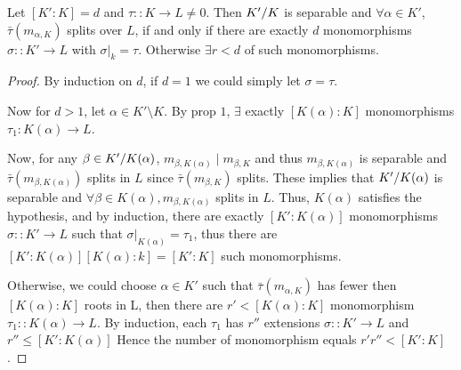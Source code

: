 \begin{prop}\label{prop:separable-field-split-have-most-embeddings}
  Let $[K': K] = d$ and $\tau:: K \to L \neq 0$. Then ${K'}/{K}$ is separable and $\forall \alpha \in K'$,
  $\bar\tau(m_{\alpha, K})$ splits over $L$, if and only if there are exactly
  $d$ monomorphisms $\sigma::K' \to L$ with $\sigma\big|_k = \tau$.
  Otherwise $\exists r < d$ of such monomorphisms.

  \begin{proof}
    By induction on $d$, if $d = 1$ we could simply let $\sigma = \tau$.

    Now for $d > 1$, let $\alpha \in K' \setminus K$.
    By prop $1$, $\exists$ exactly $[K(\alpha): K]$ monomorphisms $\tau_1: K(\alpha) \to L$.

    Now, for any $\beta \in {K'}/{K(\alpha)}$,
    $m_{\beta, K(\alpha)} \mid m_{\beta, K}$ and thus $m_{\beta, K(\alpha)}$ is separable
    and $\bar\tau(m_{\beta, K(\alpha)})$ splits in $L$ since $\bar\tau(m_{\beta, K})$ splits.
    These implies that ${K'}/{K(\alpha)}$ is separable and $\forall \beta \in K(\alpha),
    m_{\beta, K(\alpha)}$ splits in $L$. Thus, $K(\alpha)$ satisfies the hypothesis,
    and by induction, there are exactly $[K': K(\alpha)]$ monomorphisms $\sigma :: K' \to L$
    such that $\sigma\big|_{K(\alpha)} = \tau_1$, thus there are $[K': K(\alpha)][K(\alpha): k]
    = [K': K]$ such monomorphisms.

    Otherwise, we could choose $\alpha \in K'$ such that $\bar\tau(m_{\alpha, K})$ has fewer
    then $[K(\alpha): K]$ roots in L, then there are $r' < [K(\alpha): K]$ monomorphism $\tau_1 :: K(\alpha)
    \to L$. By induction, each $\tau_1$ has $r''$ extensions $\sigma :: K' \to L$ and $r'' \leq [K': K(\alpha)]$
    Hence the number of monomorphism equals $r' r'' < [K': K]$.
  \end{proof}
\end{prop}


